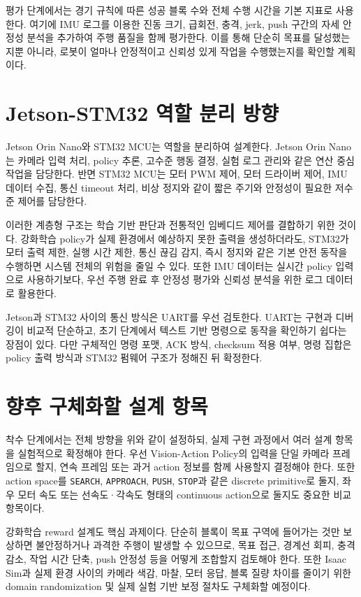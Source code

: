 \documentclass[titlepage]{pnureport}
\begin{document}
평가 단계에서는 경기 규칙에 따른 성공 블록 수와 전체 수행 시간을 기본 지표로 사용한다. 여기에 IMU 로그를 이용한 진동 크기, 급회전, 충격, jerk, push 구간의 자세 안정성 분석을 추가하여 주행 품질을 함께 평가한다. 이를 통해 단순히 목표를 달성했는지뿐 아니라, 로봇이 얼마나 안정적이고 신뢰성 있게 작업을 수행했는지를 확인할 계획이다.

\section{Jetson-STM32 역할 분리 방향}

Jetson Orin Nano와 STM32 MCU는 역할을 분리하여 설계한다. Jetson Orin Nano는 카메라 입력 처리, policy 추론, 고수준 행동 결정, 실험 로그 관리와 같은 연산 중심 작업을 담당한다. 반면 STM32 MCU는 모터 PWM 제어, 모터 드라이버 제어, IMU 데이터 수집, 통신 timeout 처리, 비상 정지와 같이 짧은 주기와 안정성이 필요한 저수준 제어를 담당한다.

이러한 계층형 구조는 학습 기반 판단과 전통적인 임베디드 제어를 결합하기 위한 것이다. 강화학습 policy가 실제 환경에서 예상하지 못한 출력을 생성하더라도, STM32가 모터 출력 제한, 실행 시간 제한, 통신 끊김 감지, 즉시 정지와 같은 기본 안전 동작을 수행하면 시스템 전체의 위험을 줄일 수 있다. 또한 IMU 데이터는 실시간 policy 입력으로 사용하기보다, 우선 주행 완료 후 안정성 평가와 신뢰성 분석을 위한 로그 데이터로 활용한다.

Jetson과 STM32 사이의 통신 방식은 UART를 우선 검토한다. UART는 구현과 디버깅이 비교적 단순하고, 초기 단계에서 텍스트 기반 명령으로 동작을 확인하기 쉽다는 장점이 있다. 다만 구체적인 명령 포맷, ACK 방식, checksum 적용 여부, 명령 집합은 policy 출력 방식과 STM32 펌웨어 구조가 정해진 뒤 확정한다.

\section{향후 구체화할 설계 항목}

착수 단계에서는 전체 방향을 위와 같이 설정하되, 실제 구현 과정에서 여러 설계 항목을 실험적으로 확정해야 한다. 우선 Vision-Action Policy의 입력을 단일 카메라 프레임으로 할지, 연속 프레임 또는 과거 action 정보를 함께 사용할지 결정해야 한다. 또한 action space를 \texttt{SEARCH}, \texttt{APPROACH}, \texttt{PUSH}, \texttt{STOP}과 같은 discrete primitive로 둘지, 좌우 모터 속도 또는 선속도·각속도 형태의 continuous action으로 둘지도 중요한 비교 항목이다.

강화학습 reward 설계도 핵심 과제이다. 단순히 블록이 목표 구역에 들어가는 것만 보상하면 불안정하거나 과격한 주행이 발생할 수 있으므로, 목표 접근, 경계선 회피, 충격 감소, 작업 시간 단축, push 안정성 등을 어떻게 조합할지 검토해야 한다. 또한 Isaac Sim과 실제 환경 사이의 카메라 색감, 마찰, 모터 응답, 블록 질량 차이를 줄이기 위한 domain randomization 및 실제 실험 기반 보정 절차도 구체화할 예정이다.
\end{document}
